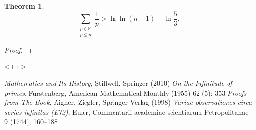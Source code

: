 \documentclass[a4paper]{article}
\newtheorem{theorem}{Theorem}[section]
\theoremstyle{definition}
\theoremstyle{remark}
\begin{document}
\begin{theorem}
  \[
  \sum_{\substack{p\in\mathbb{P}\\p\le n}}\frac{1}{p}>\ln\ln(n+1)-\ln\frac{5}{3}
  .
  \]
  \label{thm:sumReciprocalPrimeLnLn}
\end{theorem}
\begin{proof}
  
\end{proof}<++>

\begin{thebibliography}{12}
    \textit{Mathematics and Its History}, Stillwell, Springer (2010)
    \textit{On the Infinitude of primes}, Furstenberg, American Mathematical Monthly (1955) 62 (5): 353
    \textit{Proofs from The Book}, Aigner, Ziegler, Springer-Verlag (1998)
    \textit{Variae observationes circa series infinitas (E72)}, Euler, Commentarii academiae scientiarum
    Petropolitanae 9 (1744), 160–188
\end{thebibliography}
\end{document}

